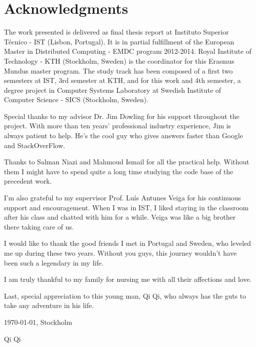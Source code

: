 \chapter*{Acknowledgments}
\thispagestyle{empty}


The work presented is delivered as final thesis report at Instituto Superior Técnico - IST (Lisbon, Portugal). It is in partial fulfillment of the European Master in Distributed Computing - EMDC program 2012-2014. Royal Institute of Technology - KTH (Stockholm, Sweden) is the coordinator for this Erasmus Mundus master program. The study track has been composed of a first two semesters at IST, 3rd semester at KTH, and for this work and 4th semester, a degree project in Computer Systems Laboratory at Swedish Institute of Computer Science - SICS (Stockholm, Sweden).

\noindent Special thanks to my advisor Dr. Jim Dowling for his support throughout the project. With more than ten years' professional industry experience, Jim is always patient to help. He's the cool guy who gives answers faster than Google and StackOverFlow.

\noindent Thanks to Salman Niazi and Mahmoud Ismail for all the practical help. Without them I might have to spend quite a long time studying the code base of the precedent work. 

\noindent I'm also grateful to my supervisor Prof. Luís Antunes Veiga for his continuous support and encouragement. When I was in IST, I liked staying in the classroom after his class and chatted with him for a while. Veiga was like a big brother there taking care of us.

\noindent I would like to thank the good friends I met in Portugal and Sweden, who leveled me up during these two years. Without you guys, this journey wouldn't have been such a legendary in my life.

\noindent I am truly thankful to my family for nursing me with all their affections and love.

\noindent Last, special appreciation to this young man, Qi Qi, who always has the guts to take any adventure in his life.

\vfill
\begin{flushright}
  \begin{minipage}{8cm}
    \begin{center}
      \today, Stockholm

      Qi Qi
    \end{center}
  \end{minipage}
\end{flushright}


